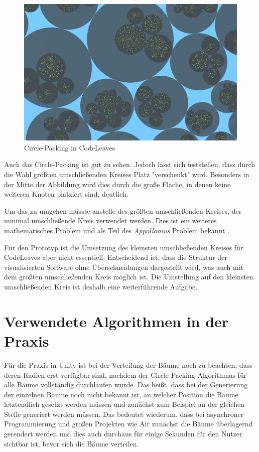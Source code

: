 \begin{figure}[htb]
  \includegraphics[width=\textwidth]{figures/circle-packing}
  \caption{Circle-Packing in CodeLeaves}
  \label{fig:circle-packing-code-leaves}
\end{figure}

Auch das Circle-Packing ist gut zu sehen. Jedoch lässt sich feststellen, dass durch die Wahl größten umschließenden Kreises Platz "verschenkt" wird. Besonders in der Mitte der Abbildung wird dies durch die große Fläche, in denen keine weiteren Knoten platziert sind, deutlich.

Um das zu umgehen müsste anstelle des größten umschließenden Kreises, der minimal umschließende Kreis verwendet werden. Dies ist ein weiteres mathematisches Problem und als Teil des \textit{Appollonius} Problem bekannt \cite{dergiades2007soddy}.


Für den Prototyp ist die Umsetzung des kleinsten umschließenden Kreises für CodeLeaves aber nicht essentiell. Entscheidend ist, dass die Struktur der visualisierten Software ohne Überschneidungen dargestellt wird, was auch mit dem größten umschließenden Kreis möglich ist. Die Umstellung auf den kleinsten umschließenden Kreis ist deshalb eine weiterführende Aufgabe.

\section{Verwendete Algorithmen in der Praxis}

Für die Praxis in Unity ist bei der Verteilung der Bäume noch zu beachten, dass deren Radien erst verfügbar sind, nachdem der Circle-Packing-Algorithmus für alle Bäume vollständig durchlaufen wurde. Das heißt, dass bei der Generierung der einzelnen Bäume noch nicht bekannt ist, an welcher Position die Bäume letztendlich gesetzt werden müssen und zunächst zum Beispiel an der gleichen Stelle generiert werden müssen. Das bedeutet wiederum, dass bei asynchroner Programmierung und großen Projekten wie Air zunächst die Bäume überlagernd gerendert werden und dies auch durchaus für einige Sekunden für den Nutzer sichtbar ist, bevor sich die Bäume verteilen.

